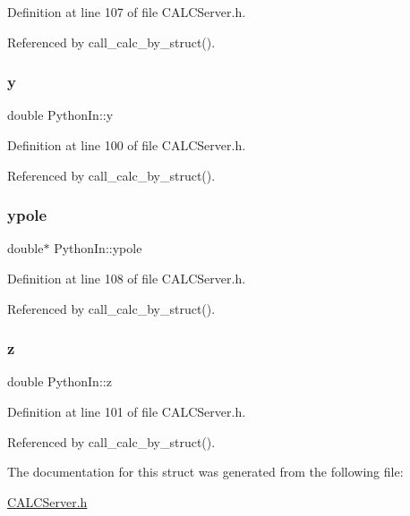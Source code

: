 Definition at line 107 of file C\+A\+L\+C\+Server.\+h.



Referenced by call\+\_\+calc\+\_\+by\+\_\+struct().

\mbox{\label{struct_python_in_a773ae302158d868fc98958aa9b0671d1}} 
\subsubsection{\texorpdfstring{y}{y}}
{\footnotesize\ttfamily double Python\+In\+::y}



Definition at line 100 of file C\+A\+L\+C\+Server.\+h.



Referenced by call\+\_\+calc\+\_\+by\+\_\+struct().

\mbox{\label{struct_python_in_a0ba3a0a96e4a050c9e02cbe497f065c3}} 
\subsubsection{\texorpdfstring{ypole}{ypole}}
{\footnotesize\ttfamily double$\ast$ Python\+In\+::ypole}



Definition at line 108 of file C\+A\+L\+C\+Server.\+h.



Referenced by call\+\_\+calc\+\_\+by\+\_\+struct().

\mbox{\label{struct_python_in_a766ef6c8019ae380824fdbeb38809cc2}} 
\subsubsection{\texorpdfstring{z}{z}}
{\footnotesize\ttfamily double Python\+In\+::z}



Definition at line 101 of file C\+A\+L\+C\+Server.\+h.



Referenced by call\+\_\+calc\+\_\+by\+\_\+struct().



The documentation for this struct was generated from the following file\+:\begin{DoxyCompactItemize}
\item 
\hyperlink{_c_a_l_c_server_8h}{C\+A\+L\+C\+Server.\+h}\end{DoxyCompactItemize}
